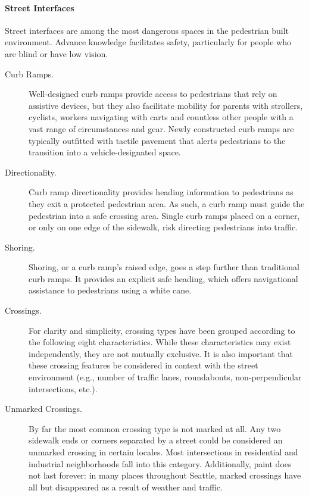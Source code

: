 \paragraph{Street Interfaces}
Street interfaces are among the most dangerous spaces in the pedestrian built environment.  Advance knowledge facilitates safety, particularly for people who are blind or have low vision.
\begin{description}
    
\item[Curb Ramps.]
Well-designed curb ramps provide access to pedestrians that rely on assistive devices, but they also facilitate mobility for parents with strollers, cyclists, workers navigating with carts and countless other people with a vast range of circumstances and gear. Newly constructed curb ramps are typically outfitted with tactile pavement that alerts pedestrians to the transition into a vehicle-designated space.

\item[Directionality.]
Curb ramp directionality provides heading information to pedestrians as they exit a protected pedestrian area. As such, a curb ramp must guide the pedestrian into a safe crossing area.  Single curb ramps placed on a corner, or only on one edge of the sidewalk, risk directing pedestrians into traffic.  

\item[Shoring.]
Shoring, or a curb ramp’s raised edge, goes a step further than traditional curb ramps.  It provides an explicit safe heading, which offers navigational assistance to pedestrians using a white cane.  

\item[Crossings.]
For clarity and simplicity, crossing types have been grouped according to the following eight characteristics.  While these characteristics may exist independently, they are not mutually exclusive.  It is also important that these crossing features be considered in context with the street environment (e.g., number of traffic lanes, roundabouts, non-perpendicular intersections, etc.).  

\item[Unmarked Crossings.]
By far the most common crossing type is not marked at all. Any two sidewalk ends or corners separated by a street could be considered an unmarked crossing in certain locales.  Most intersections in residential and industrial neighborhoods fall into this category. Additionally, paint does not last forever: in many places throughout Seattle, marked crossings have all but disappeared as a result of weather and traffic.


\end{description}
